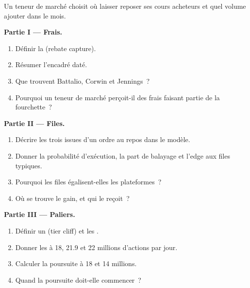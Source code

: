 \begin{problem}\label{pb:hf:rebates-inverted-venues-and-tiers:1}
Un teneur de marché choisit où laisser reposer ses cours acheteurs et quel volume ajouter dans le mois.

\medskip\noindent\textbf{Partie I --- Frais.}
\begin{enumerate}
\item Définir la  (rebate capture).
\item Résumer l'encadré daté.
\item Que trouvent Battalio, Corwin et Jennings~?
\item Pourquoi un teneur de marché perçoit-il des frais faisant partie de la fourchette~?
\end{enumerate}

\medskip\noindent\textbf{Partie II --- Files.}
\begin{enumerate}[resume]
\item Décrire les trois issues d'un ordre au repos dans le modèle.
\item Donner la probabilité d'exécution, la part de balayage et l'edge aux files typiques.
\item Pourquoi les files égalisent-elles les plateformes~?
\item Où se trouve le gain, et qui le reçoit~?
\end{enumerate}

\medskip\noindent\textbf{Partie III --- Paliers.}
\begin{enumerate}[resume]
\item Définir un  (tier cliff) et les .
\item Donner les  à 18, 21.9 et 22 millions d'actions par jour.
\item Calculer la poursuite à 18 et 14 millions.
\item Quand la poursuite doit-elle commencer~?
\end{enumerate}


\end{problem}
